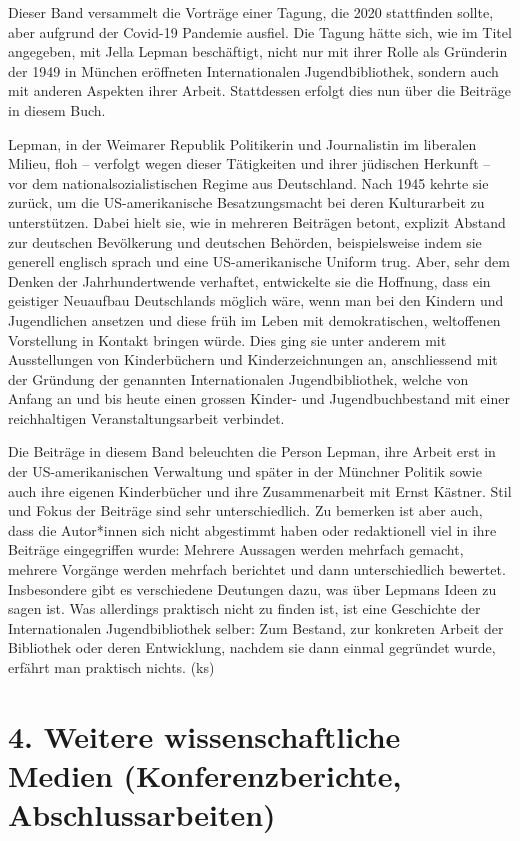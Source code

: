 \documentclass[a4paper,
fontsize=11pt,
oneside,
numbers=noperiodatend,
parskip=half-,
bibliography=totoc,
final
]{scrartcl}
\begin{document}
Dieser Band versammelt die Vorträge einer Tagung, die 2020 stattfinden
sollte, aber aufgrund der Covid-19 Pandemie ausfiel. Die Tagung hätte
sich, wie im Titel angegeben, mit Jella Lepman beschäftigt, nicht nur
mit ihrer Rolle als Gründerin der 1949 in München eröffneten
Internationalen Jugendbibliothek, sondern auch mit anderen Aspekten
ihrer Arbeit. Stattdessen erfolgt dies nun über die Beiträge in diesem
Buch.

Lepman, in der Weimarer Republik Politikerin und Journalistin im
liberalen Milieu, floh -- verfolgt wegen dieser Tätigkeiten und ihrer
jüdischen Herkunft -- vor dem nationalsozialistischen Regime aus
Deutschland. Nach 1945 kehrte sie zurück, um die US-amerikanische
Besatzungsmacht bei deren Kulturarbeit zu unterstützen. Dabei hielt sie,
wie in mehreren Beiträgen betont, explizit Abstand zur deutschen
Bevölkerung und deutschen Behörden, beispielsweise indem sie generell
englisch sprach und eine US-amerikanische Uniform trug. Aber, sehr dem
Denken der Jahrhundertwende verhaftet, entwickelte sie die Hoffnung,
dass ein geistiger Neuaufbau Deutschlands möglich wäre, wenn man bei den
Kindern und Jugendlichen ansetzen und diese früh im Leben mit
demokratischen, weltoffenen Vorstellung in Kontakt bringen würde. Dies
ging sie unter anderem mit Ausstellungen von Kinderbüchern und
Kinderzeichnungen an, anschliessend mit der Gründung der genannten
Internationalen Jugendbibliothek, welche von Anfang an und bis heute
einen grossen Kinder- und Jugendbuchbestand mit einer reichhaltigen
Veranstaltungsarbeit verbindet.

Die Beiträge in diesem Band beleuchten die Person Lepman, ihre Arbeit
erst in der US-amerika\-nischen Verwaltung und später in der Münchner
Politik sowie auch ihre eigenen Kinderbücher und ihre Zusammenarbeit mit
Ernst Kästner. Stil und Fokus der Beiträge sind sehr unterschiedlich. Zu
bemerken ist aber auch, dass die Autor*innen sich nicht abgestimmt haben
oder redaktionell viel in ihre Beiträge eingegriffen wurde: Mehrere
Aussagen werden mehrfach gemacht, mehrere Vorgänge werden mehrfach
berichtet und dann unterschiedlich bewertet. Insbesondere gibt es
verschiedene Deutungen dazu, was über Lepmans Ideen zu sagen ist. Was
allerdings praktisch nicht zu finden ist, ist eine Geschichte der
Internationalen Jugendbibliothek selber: Zum Bestand, zur konkreten
Arbeit der Bibliothek oder deren Entwicklung, nachdem sie dann einmal
gegründet wurde, erfährt man praktisch nichts. (ks)

\hypertarget{weitere-wissenschaftliche-medien-konferenzberichte-abschlussarbeiten}{%
\section{4. Weitere wissenschaftliche Medien (Konferenzberichte,
Abschlussarbeiten)}\label{weitere-wissenschaftliche-medien-konferenzberichte-abschlussarbeiten}}
\end{document}
